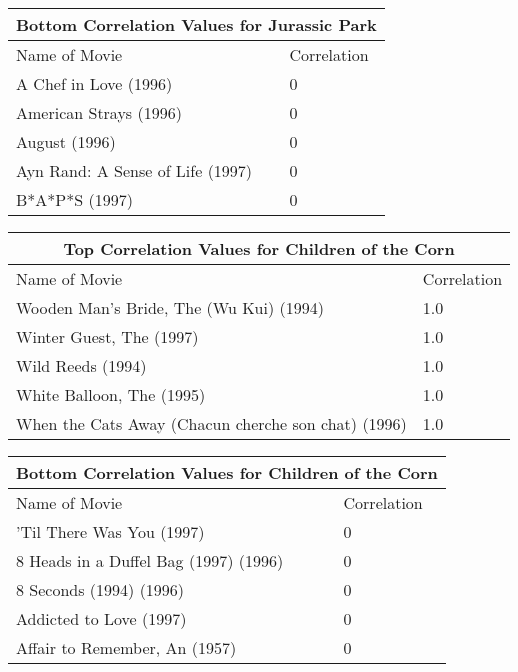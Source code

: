 \documentclass[11pt]{scrartcl} %
\begin{document}
\begin{center}
\begin{tabular}{ |p{9cm}||p{3cm}| }
 \hline
 \multicolumn{2}{|c|}{Bottom Correlation Values for Jurassic Park} \\
 \hline
 Name of Movie & Correlation\\
 \hline
 A Chef in Love (1996)   & 0 \\
 American Strays (1996) &   0  \\
 August (1996) & 0 \\
 Ayn Rand: A Sense of Life (1997) & 0 \\
 B*A*P*S (1997) &  0 \\
 \hline
\end{tabular}
\end{center}
\pagebreak
\begin{center}
\begin{tabular}{ |p{9.0 cm}||p{3cm}| }
 \hline
 \multicolumn{2}{|c|}{Top Correlation Values for Children of the Corn} \\
 \hline
 Name of Movie & Correlation\\
 \hline
 Wooden Man's Bride, The (Wu Kui) (1994)   & 1.0 \\
 Winter Guest, The (1997) &   1.0  \\
 Wild Reeds (1994) & 1.0 \\
 White Balloon, The (1995) & 1.0 \\
 When the Cats Away (Chacun cherche son chat) (1996) &   1.0 \\
 \hline
\end{tabular}
\end{center}

\begin{center}
\begin{tabular}{ |p{9.0cm}||p{3cm}| }
 \hline
 \multicolumn{2}{|c|}{Bottom Correlation Values for Children of the Corn} \\
 \hline
 Name of Movie & Correlation\\
 \hline
 'Til There Was You (1997)   & 0 \\
 8 Heads in a Duffel Bag (1997) (1996) &   0  \\
 8 Seconds (1994) (1996) & 0 \\
 Addicted to Love (1997) & 0 \\
 Affair to Remember, An (1957) &  0 \\
 \hline
\end{tabular}
\end{center}
\end{document}
